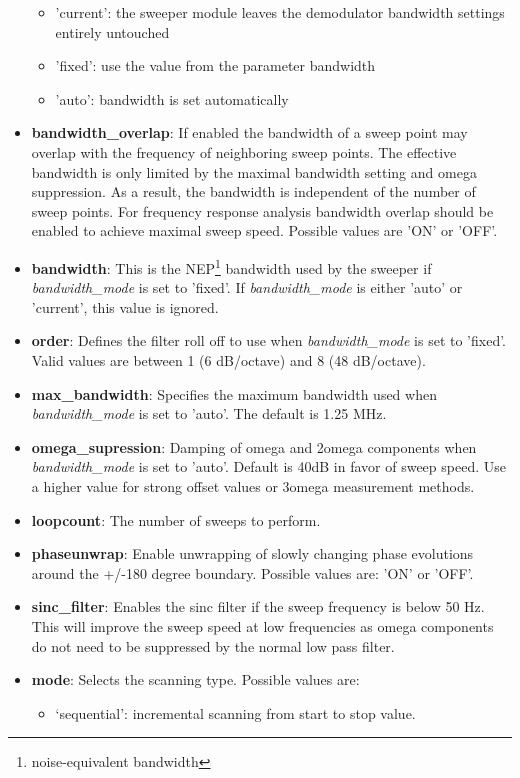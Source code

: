 \documentclass[11pt]{article} %
\begin{document}
\begin{itemize}
	\begin{itemize}[]
	\itemsep0pt
	\item 'current': the sweeper module leaves the demodulator bandwidth settings entirely untouched
	\item 'fixed': use the value from the parameter bandwidth
	\item 'auto': bandwidth is set automatically
	\end{itemize}
\item {\bf bandwidth\_overlap}: If enabled the bandwidth of a sweep point may overlap with the frequency of neighboring sweep points. The effective bandwidth is only limited by the maximal bandwidth setting and omega suppression. As a result, the bandwidth is independent of the number of sweep points. For frequency response analysis bandwidth overlap should be enabled to achieve maximal sweep speed. Possible values are 'ON' or 'OFF'.
\item {\bf bandwidth}: This is the NEP\footnote{noise-equivalent bandwidth} bandwidth used by the sweeper if {\it bandwidth\_mode} is set to 'fixed'. If {\it bandwidth\_mode} is either 'auto' or 'current', this value is ignored.
\item {\bf order}: Defines the filter roll off to use when {\it bandwidth\_mode} is set to 'fixed'. Valid values are between 1 (6 dB/octave) and 8 (48 dB/octave).
\item {\bf max\_bandwidth}: Specifies the maximum bandwidth used when {\it bandwidth\_mode} is set to 'auto'. The default is 1.25 MHz.
\item {\bf omega\_supression}: Damping of omega and 2omega components when {\it bandwidth\_mode} is set to 'auto'. Default is 40dB in favor of sweep speed. Use a higher value for strong offset values or 3omega measurement methods.
\item {\bf loopcount}: The number of sweeps to perform.
\item {\bf phaseunwrap}: Enable unwrapping of slowly changing phase evolutions around the +/-180 degree boundary. Possible values are: 'ON' or 'OFF'.
\item {\bf sinc\_filter}: Enables the sinc filter if the sweep frequency is below 50 Hz. This will improve the sweep speed at low frequencies as omega components do not need to be suppressed by the normal low pass filter.
\item {\bf mode}: Selects the scanning type. Possible values are:
	\begin{itemize}[]
	\itemsep0pt
	\item `sequential': incremental scanning from start to stop value.

\end{itemize}
\end{itemize}
\end{document}
